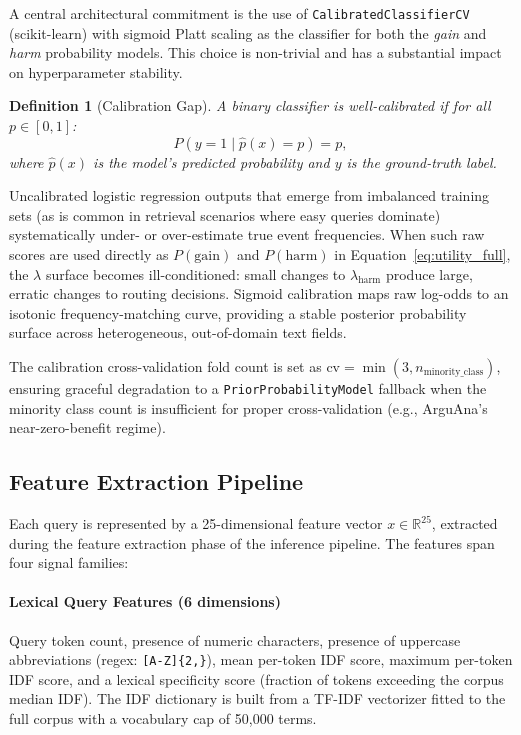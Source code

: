 \documentclass[journal]{IEEEtran}
\newtheorem{definition}{Definition}
\begin{document}
A central architectural commitment is the use of
\texttt{CalibratedClassifierCV} (scikit-learn) with sigmoid Platt
scaling as the classifier for both the \textit{gain} and \textit{harm}
probability models. This choice is non-trivial and has a substantial
impact on hyperparameter stability.

\begin{definition}[Calibration Gap]
A binary classifier is \emph{well-calibrated} if for all
$p \in [0,1]$:
\begin{equation}
P(y = 1 \mid \hat{p}(x) = p) = p,
\end{equation}
where $\hat{p}(x)$ is the model's predicted probability and $y$ is
the ground-truth label.
\end{definition}

Uncalibrated logistic regression outputs that emerge from imbalanced
training sets (as is common in retrieval scenarios where easy queries
dominate) systematically under- or over-estimate true event
frequencies. When such raw scores are used directly as $P(\text{gain})$
and $P(\text{harm})$ in Equation~\eqref{eq:utility_full}, the
$\lambda$ surface becomes ill-conditioned: small changes to
$\lambda_{\text{harm}}$ produce large, erratic changes to routing
decisions. Sigmoid calibration maps raw log-odds to an isotonic
frequency-matching curve, providing a stable posterior probability
surface across heterogeneous, out-of-domain text fields.

The calibration cross-validation fold count is set as
$\text{cv} = \min(3, n_{\text{minority\_class}})$, ensuring
graceful degradation to a \texttt{PriorProbabilityModel} fallback
when the minority class count is insufficient for proper
cross-validation (e.g., ArguAna's near-zero-benefit regime).

\subsection{Feature Extraction Pipeline}
\label{sec:features}

Each query is represented by a 25-dimensional feature vector
$x \in \mathbb{R}^{25}$, extracted during the feature extraction
phase of the inference pipeline. The features
span four signal families:

\paragraph{Lexical Query Features (6 dimensions)}
Query token count, presence of numeric characters, presence of
uppercase abbreviations (regex: \texttt{[A-Z]\{2,\}}), mean
per-token IDF score, maximum per-token IDF score, and a lexical
specificity score (fraction of tokens exceeding the corpus median
IDF). The IDF dictionary is built from a TF-IDF vectorizer fitted
to the full corpus with a vocabulary cap of 50,000 terms.
\end{document}
